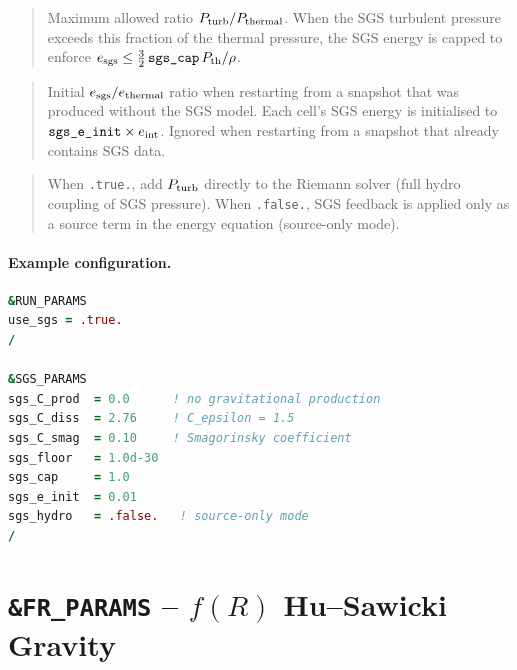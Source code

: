 \begin{quote}
Maximum allowed ratio $P_{\rm turb}/P_{\rm thermal}$.  When the SGS
turbulent pressure exceeds this fraction of the thermal pressure, the
SGS energy is capped to enforce
$e_{\rm sgs} \le \tfrac{3}{2}\,\texttt{sgs\_cap}\,P_{\rm th}/\rho$.
\end{quote}

\label{param:sgs_e_init}

\begin{quote}
Initial $e_{\rm sgs}/e_{\rm thermal}$ ratio when restarting from a
snapshot that was produced without the SGS model.  Each cell's SGS
energy is initialised to $\texttt{sgs\_e\_init}\times e_{\rm int}$.
Ignored when restarting from a snapshot that already contains SGS data.
\end{quote}

\label{param:sgs_hydro}

\begin{quote}
When \texttt{.true.}, add $P_{\rm turb}$ directly to the Riemann solver
(full hydro coupling of SGS pressure).  When \texttt{.false.}, SGS
feedback is applied only as a source term in the energy equation
(source-only mode).

\end{quote}

\paragraph{Example configuration.}
\begin{lstlisting}[language=Fortran]
&RUN_PARAMS
use_sgs = .true.
/

&SGS_PARAMS
sgs_C_prod  = 0.0      ! no gravitational production
sgs_C_diss  = 2.76     ! C_epsilon = 1.5
sgs_C_smag  = 0.10     ! Smagorinsky coefficient
sgs_floor   = 1.0d-30
sgs_cap     = 1.0
sgs_e_init  = 0.01
sgs_hydro   = .false.   ! source-only mode
/
\end{lstlisting}


\section{\texttt{\&FR\_PARAMS} -- $f(R)$ Hu--Sawicki Gravity}
\label{sec:fr_params}

